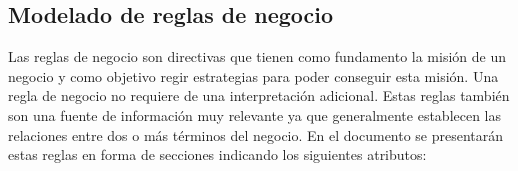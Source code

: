 %

\subsection{Modelado de reglas de negocio}

Las reglas de negocio son directivas que tienen como fundamento la misión de un 
negocio y como objetivo regir estrategias para poder conseguir esta misión. Una 
regla de negocio no requiere de una interpretación adicional. Estas reglas 
también son una fuente de información muy relevante ya que generalmente 
establecen las relaciones entre dos o más términos del negocio.
En el documento se presentarán estas reglas en forma de secciones indicando los 
siguientes atributos:

